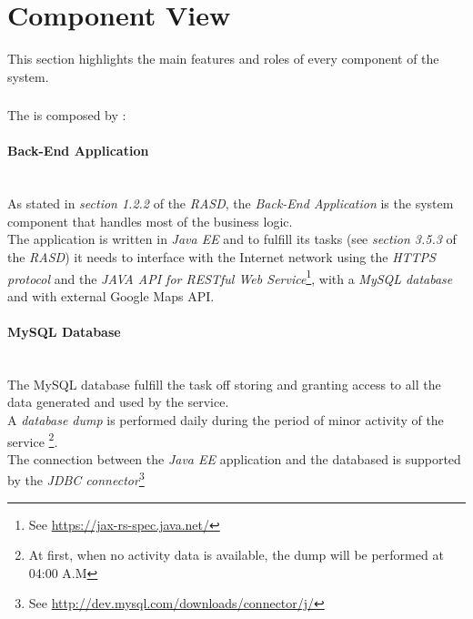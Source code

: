 \section{Component View} %
\label{sec:component_view}
This section highlights the main features and roles of every component of the system.
\subsubsection{} %
\label{ssub:nameref_}
The  is composed by :

\paragraph{Back-End Application} %
\label{par:back_end_application}\hfill \\
As stated in \emph{section 1.2.2} of the \emph{RASD}, the \emph{Back-End Application} is the system component that handles most of the business logic.\\
The application is written in \emph{Java EE} and to fulfill its tasks (see \emph{section 3.5.3} of the \emph{RASD}) it needs to interface with the Internet network using the \emph{HTTPS protocol} and the \emph{JAVA API for RESTful Web Service}\footnote{See \url{https://jax-rs-spec.java.net/}}, with a \emph{MySQL database} and with external Google Maps API.\\

\paragraph{MySQL Database} %
\label{par:mysql_database}\hfill \\
The MySQL database fulfill the task off storing and granting access to all the data generated and used by the service.\\
A \emph{database dump} is performed daily during the period of minor activity of the service \footnote{At first, when no activity data is available, the dump will be performed at 04:00 A.M}.\\
The connection between the \emph{Java EE} application and the databased is supported by the \emph{JDBC connector}\footnote{See \url{http://dev.mysql.com/downloads/connector/j/}}\\






